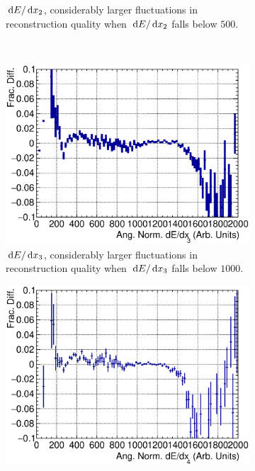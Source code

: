 \begin{figure}[ht]
\begin{subfigure}{\dbfigwid\textwidth}
           \caption{$\,\textrm{d}E/\,\textrm{d}x_2$, considerably larger fluctuations in reconstruction quality when $\,\textrm{d}E/\,\textrm{d}x_2$ falls below $500$.}
           \label{subfig:dedx1}
      \end{subfigure}
      \\
      \begin{subfigure}{\dbfigwid\textwidth}
           \includegraphics[width=\textwidth]{figures/sel/fig53c.eps}
           \caption{$\,\textrm{d}E/\,\textrm{d}x_3$, considerably larger fluctuations in reconstruction quality when $\,\textrm{d}E/\,\textrm{d}x_3$ falls below $1000$.}
           \label{subfig:dedx2}
      \end{subfigure}
      \begin{subfigure}{\dbfigwid\textwidth}
           \includegraphics[width=\textwidth]{figures/sel/fig53d.eps}

\end{subfigure}
\end{figure}
